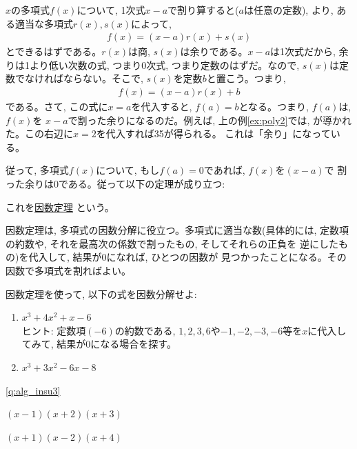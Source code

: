 $x$の多項式$f(x)$について, 1次式$x-a$で割り算すると($a$は任意の定数), より, 
ある適当な多項式$r(x), s(x)$によって, 
\begin{eqnarray}
f(x)=(x-a)r(x)+s(x)
\end{eqnarray}
とできるはずである。$r(x)$は商, $s(x)$は余りである。$x-a$は1次式だから, 
余りは1より低い次数の式, つまり0次式, つまり定数のはずだ。なので, 
$s(x)$は定数でなければならない。そこで, $s(x)$を定数$b$と置こう。つまり, 
\begin{eqnarray}
f(x)=(x-a)r(x)+b
\end{eqnarray}
である。さて, この式に$x=a$を代入すると, $f(a)=b$となる。つまり, $f(a)$は, $f(x)$を
$x-a$で割った余りになるのだ。例えば, 上の例\ref{ex:poly2}では, 
が導かれた。この右辺に$x=2$を代入すれば35が得られる。
これは「余り」になっている。

従って, 多項式$f(x)$について, もし$f(a)=0$であれば, $f(x)$を$(x-a)$で
割った余りは0である。従って以下の定理が成り立つ:\hv

これを\underline{因数定理}\label{th:insuteiri}
という。\hv

因数定理は, 多項式の因数分解に役立つ。多項式に適当な数(具体的には, 
定数項の約数や, それを最高次の係数で割ったもの, そしてそれらの正負を
逆にしたもの)を代入して, 結果が0になれば, ひとつの因数が
見つかったことになる。その因数で多項式を割ればよい。
\vspace{0.3cm}

\begin{q}\label{q:alg_insu3}
 因数定理を使って, 以下の式を因数分解せよ:
\begin{enumerate}
\item $x ^3 + 4x ^2+x-6$\\
ヒント: 定数項$(-6)$の約数である, $1, 2, 3, 6$や$-1, -2, -3, -6$等を$x$に代入してみて, 結果が$0$になる場合を探す。
\item $x ^3 + 3x ^2-6x-8$
\end{enumerate}
\end{q}

\ref{q:alg_insu3}  
\begin{edaenumerate}
\item $(x-1)(x+2)(x+3)$
\item $(x+1)(x-2)(x+4)$
\end{edaenumerate}
\hv



